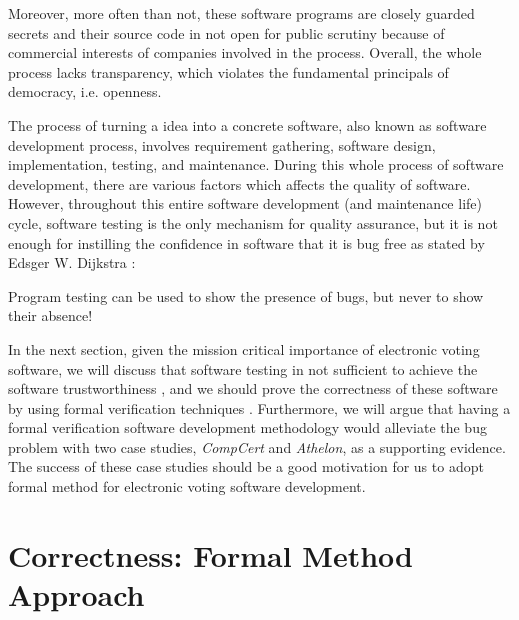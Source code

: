    \noindent 
   Moreover, more often than not, these software programs
   are closely guarded secrets and their source 
   code in not open for public scrutiny because of commercial 
   interests of companies \citep{AEC:2013:LMM} involved in the 
   process.  Overall, the whole process lacks transparency, which 
   violates the fundamental principals of democracy, i.e. openness. 
  
   The process  of turning a  idea into a 
   concrete software, also known as software development process, involves 
   requirement gathering, software design, implementation, testing, and maintenance. 
   During this whole process of software development, there are various factors 
   which affects the quality of software.  However, 
   throughout this entire software development (and maintenance life) cycle,
   software testing is the only mechanism for quality assurance, but
   it is not enough for 
   instilling the confidence in software that it is bug free 
   as stated by Edsger W. Dijkstra \citep{Dijkstra:1972:HP:355604.361591}:
   \begin{displayquote}
   Program testing can be used to show the presence of bugs, 
    but never to show their absence!
   \end{displayquote}
  
   
   In the next section, given the mission critical importance of electronic voting software, 
   we will discuss that software testing 
   in not sufficient to achieve the software trustworthiness \citep{10.1007/978-3-642-35795-4_5},  and we should 
   prove the  correctness of these software
   by using formal verification techniques \citep{BECKERT2014115}.
   Furthermore, we will argue that  having a formal verification software development methodology \citep{10.1007/978-3-319-95582-7_38}
    would alleviate 
	the bug problem with two case studies, \textit{CompCert} and \textit{Athelon}, as a supporting evidence. The success of these 
	case studies should be a good motivation for us to adopt formal method for electronic voting software development. 
   
   
   \section{Correctness: Formal Method Approach}
   \label{secback:correctness_formal}

